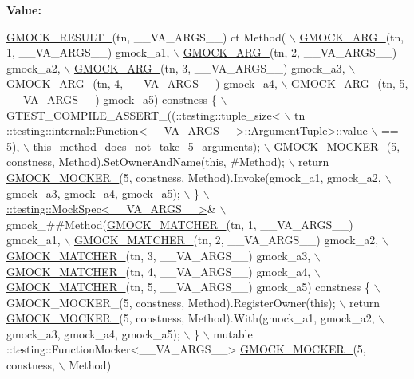 {\bfseries Value\+:}
\begin{DoxyCode}
\hyperlink{gmock-generated-function-mockers_8h_a0e9d94e9c77df84f1103af06feee1077}{GMOCK\_RESULT\_}(tn, \_\_VA\_ARGS\_\_) ct Method( \(\backslash\)
      \hyperlink{gmock-generated-function-mockers_8h_a887575cc1c31158fba808180a10c004f}{GMOCK\_ARG\_}(tn, 1, \_\_VA\_ARGS\_\_) gmock\_a1, \(\backslash\)
      \hyperlink{gmock-generated-function-mockers_8h_a887575cc1c31158fba808180a10c004f}{GMOCK\_ARG\_}(tn, 2, \_\_VA\_ARGS\_\_) gmock\_a2, \(\backslash\)
      \hyperlink{gmock-generated-function-mockers_8h_a887575cc1c31158fba808180a10c004f}{GMOCK\_ARG\_}(tn, 3, \_\_VA\_ARGS\_\_) gmock\_a3, \(\backslash\)
      \hyperlink{gmock-generated-function-mockers_8h_a887575cc1c31158fba808180a10c004f}{GMOCK\_ARG\_}(tn, 4, \_\_VA\_ARGS\_\_) gmock\_a4, \(\backslash\)
      \hyperlink{gmock-generated-function-mockers_8h_a887575cc1c31158fba808180a10c004f}{GMOCK\_ARG\_}(tn, 5, \_\_VA\_ARGS\_\_) gmock\_a5) constness \{ \(\backslash\)
    GTEST\_COMPILE\_ASSERT\_((::testing::tuple\_size<                          \(\backslash\)
        tn ::testing::internal::Function<\_\_VA\_ARGS\_\_>::ArgumentTuple>::value \(\backslash\)
            == 5), \(\backslash\)
        this\_method\_does\_not\_take\_5\_arguments); \(\backslash\)
    GMOCK\_MOCKER\_(5, constness, Method).SetOwnerAndName(\textcolor{keyword}{this}, #Method); \(\backslash\)
    return \hyperlink{gmock-generated-function-mockers_8h_a7d362499e27b1bc3a9806dd3cf58a5b7}{GMOCK\_MOCKER\_}(5, constness, Method).Invoke(gmock\_a1, gmock\_a2, \(\backslash\)
        gmock\_a3, gmock\_a4, gmock\_a5); \(\backslash\)
  \} \(\backslash\)
  \hyperlink{classtesting_1_1internal_1_1MockSpec}{::testing::MockSpec<\_\_VA\_ARGS\_\_>}& \(\backslash\)
      gmock\_##Method(\hyperlink{gmock-generated-function-mockers_8h_aa87d0009fe91f1c89d658776b55a769c}{GMOCK\_MATCHER\_}(tn, 1, \_\_VA\_ARGS\_\_) gmock\_a1, \(\backslash\)
                     \hyperlink{gmock-generated-function-mockers_8h_aa87d0009fe91f1c89d658776b55a769c}{GMOCK\_MATCHER\_}(tn, 2, \_\_VA\_ARGS\_\_) gmock\_a2, \(\backslash\)
                     \hyperlink{gmock-generated-function-mockers_8h_aa87d0009fe91f1c89d658776b55a769c}{GMOCK\_MATCHER\_}(tn, 3, \_\_VA\_ARGS\_\_) gmock\_a3, \(\backslash\)
                     \hyperlink{gmock-generated-function-mockers_8h_aa87d0009fe91f1c89d658776b55a769c}{GMOCK\_MATCHER\_}(tn, 4, \_\_VA\_ARGS\_\_) gmock\_a4, \(\backslash\)
                     \hyperlink{gmock-generated-function-mockers_8h_aa87d0009fe91f1c89d658776b55a769c}{GMOCK\_MATCHER\_}(tn, 5, \_\_VA\_ARGS\_\_) gmock\_a5) constness \{ \(\backslash\)
    GMOCK\_MOCKER\_(5, constness, Method).RegisterOwner(\textcolor{keyword}{this}); \(\backslash\)
    return \hyperlink{gmock-generated-function-mockers_8h_a7d362499e27b1bc3a9806dd3cf58a5b7}{GMOCK\_MOCKER\_}(5, constness, Method).With(gmock\_a1, gmock\_a2, \(\backslash\)
        gmock\_a3, gmock\_a4, gmock\_a5); \(\backslash\)
  \} \(\backslash\)
  mutable ::testing::FunctionMocker<\_\_VA\_ARGS\_\_> \hyperlink{gmock-generated-function-mockers_8h_a7d362499e27b1bc3a9806dd3cf58a5b7}{GMOCK\_MOCKER\_}(5, constness, \(\backslash\)
      Method)
\end{DoxyCode}


